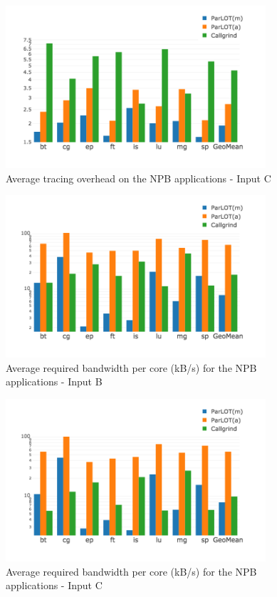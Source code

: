 {\begin{figure}[t]
\centering
\includegraphics[width=3.8in]{figs.comet.newMed/comet_chartAvg_sd_C_p3_5.png}
\caption{ Average tracing overhead on the NPB applications - Input C}
\label{comet_chartAvg_sd_C_p3_5}
\end{figure}

\begin{figure}[t]
\centering
\includegraphics[width=3.8in]{figs.comet.newMed/comet_chartAvg_bw_B_p3_5.png}
\caption{  Average required bandwidth per core (kB/s) for the NPB applications - Input B}
\label{comet_chartAvg_bw_B_p3_5}
\end{figure}

\begin{figure}[t]
\centering
\includegraphics[width=3.8in]{figs.comet.newMed/comet_chartAvg_bw_C_p3_5.png}
\caption{ Average required bandwidth per core (kB/s) for the NPB applications - Input C}
\label{comet_chartAvg_bw_C_p3_5}
\end{figure}

}
